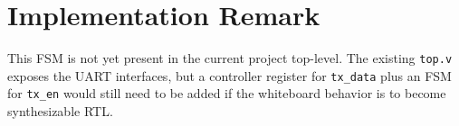 \documentclass[11pt]{article}
\begin{document}
\section*{Implementation Remark}

This FSM is not yet present in the current project top-level. The existing
\texttt{top.v} exposes the UART interfaces, but a controller register for
\texttt{tx\_data} plus an FSM for \texttt{tx\_en} would still need to be added
if the whiteboard behavior is to become synthesizable RTL.
\end{document}
